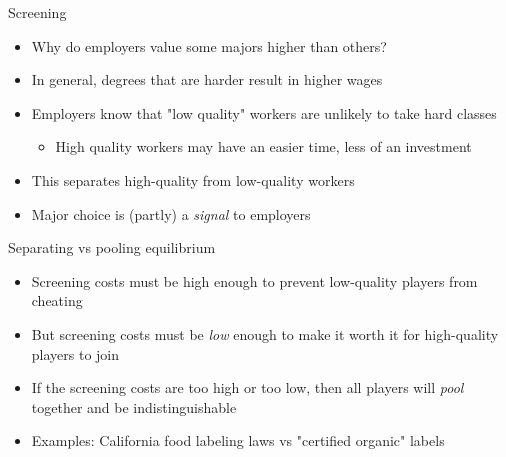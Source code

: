 \documentclass[10pt]{beamer}
\begin{document}
\begin{frame}[label={sec:org36ddfc9}]{}
\alert{Screening}
\begin{itemize}
\item Why do employers value some majors higher than others?
\item In general, degrees that are harder result in higher wages
\item Employers know that "low quality" workers are unlikely to take hard classes
\begin{itemize}
\item High quality workers may have an easier time, less of an investment
\end{itemize}
\item This separates high-quality from low-quality workers
\item Major choice is (partly) a \emph{signal} to employers
\end{itemize}
\end{frame}

\begin{frame}[label={sec:orga219b72}]{}
\alert{Separating vs pooling equilibrium}
\begin{itemize}
\item Screening costs must be high enough to prevent low-quality players from cheating
\item But screening costs must be \emph{low} enough to make it worth it for high-quality players to join
\item If the screening costs are too high or too low, then all players will \emph{pool} together and be indistinguishable
\item Examples: California food labeling laws vs "certified organic" labels
\end{itemize}
\end{frame}
\end{document}
